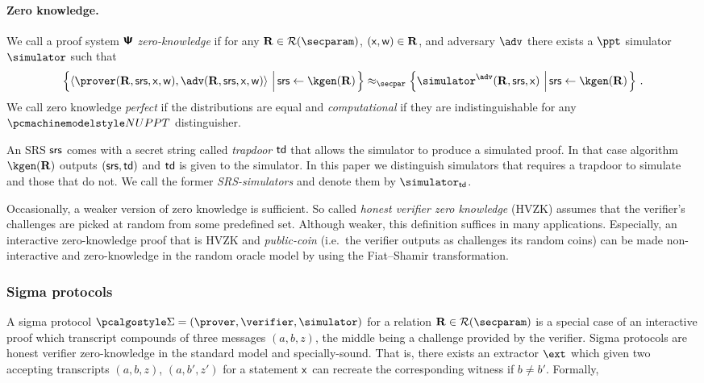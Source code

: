 \documentclass[runningheads,11pt]{llncs}
\theoremstyle{definition} \newtheorem{definition}[theorem]{Definition}
\begin{document}
 \paragraph{Zero knowledge.}
 We call a proof system $\bm{\mathsf{\Psi}}$ \emph{zero-knowledge} if for any
 $\REL \in \RELGEN(\secparam)$, $(\mathsf{x}, \mathsf{w}) \in \mathbf{R}$, and adversary $\adv$
 there exists a $\ppt$ simulator $\simulator$ such that
	\begin{multline*}
	  \left\{\ip{\prover(\REL, \srs, \inp, \wit)}{\adv(\REL, \srs, \inp, \wit)}
      \,\left|\, \srs \gets \kgen(\REL)\COMMENT{, (\inp, \wit) \gets \adv(\REL,
          \srs)}\vphantom{\simulator^\adv}\right.\right\} \approx_\secpar
		\left\{\simulator^{\adv}(\REL, \srs, \inp)\,\left|\, \srs \gets
        \kgen(\REL)\COMMENT{, (\inp, \wit) \gets \adv(\REL,
          \srs)}\vphantom{\simulator^\adv}\right.\right\}\,.
\end{multline*}
We call zero knowledge \emph{perfect} if the distributions are equal and
\emph{computational} if they are indistinguishable for any $\nuppt$
distinguisher.

An SRS $\mathsf{srs}$ comes with a secret string called \emph{trapdoor} $\mathsf{td}$ that
allows the simulator to produce a simulated proof. In that case algorithm
$\kgen(\REL)$ outputs $(\mathsf{srs}, \mathsf{td})$ and $\mathsf{td}$ is given to the simulator. In this
paper we distinguish simulators that requires a trapdoor to simulate and those
that do not. We call the former \emph{SRS-simulators} and denote them by
$\simulator_\td$.

Occasionally, a weaker version of zero knowledge is sufficient. So called
\emph{honest verifier zero knowledge} (HVZK) assumes that the verifier's
challenges are picked at random from some predefined set. Although weaker, this
definition suffices in many applications. Especially, an interactive
zero-knowledge proof that is HVZK and \emph{public-coin} (i.e.~the verifier
outputs as challenges its random coins) can be made non-interactive and
zero-knowledge in the random oracle model by using the Fiat--Shamir
transformation.
	

\subsubsection{Sigma protocols}
A sigma protocol $\sigmaprot = (\prover, \verifier, \simulator)$ for a relation
$\REL \in \RELGEN(\secparam)$ is a special case of an interactive proof which
transcript compounds of three messages $(a, b, z)$, the middle being a challenge
provided by the verifier. Sigma protocols are honest verifier zero-knowledge in
the standard model and specially-sound. That is, there exists an extractor
$\ext$ which given two accepting transcripts $(a, b, z)$, $(a, b', z')$ for a
statement $\mathsf{x}$ can recreate the corresponding witness if $b \neq b'$.
Formally,
\end{document}

